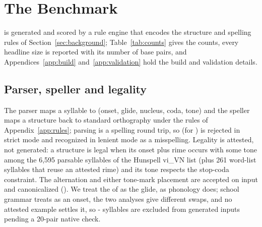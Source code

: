 \section{The \noilai{} Benchmark}
\label{sec:benchmark}

\noilai{} is generated and scored by a rule engine that encodes the structure and spelling rules of Section~\ref{sec:background}; Table~\ref{tab:counts} gives the counts, every headline size is reported with its number of base pairs, and Appendices~\ref{app:build} and~\ref{app:validation} hold the build and validation details.



\subsection{Parser, speller and legality}
\label{sec:engine}
The parser maps a syllable to (onset, glide, nucleus, coda, tone) and the speller maps a structure back to standard orthography under the rules of Appendix~\ref{app:rules}; parsing is a spelling round trip, so  (for ) is rejected in strict mode and recognized in lenient mode as a misspelling. Legality is attested, not generated: a structure is legal when its onset plus rime occurs with some tone among the 6,595 parsable syllables of the Hunspell vi\_VN list \citep{hunspell-vi} (plus 261 word-list syllables that reuse an attested rime) and its tone respects the stop-coda constraint. The  alternation and either tone-mark placement are accepted on input and canonicalized (). We treat the  of  as the glide, as phonology does; school grammar treats  as an onset, the two analyses give different swaps, and no attested example settles it, so - syllables are excluded from generated inputs pending a 20-pair native check.

